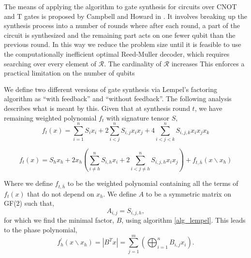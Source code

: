 \documentclass{article}
\theoremstyle{definition}
\theoremstyle{problem}
\theoremstyle{lemma}
\begin{document}
		 The means of applying the algorithm to gate synthesis for circuits over CNOT and T gates is proposed by Campbell and Howard in \cite{1_Campbell_2017}. It involves breaking up the synthesis process into a number of rounds where after each round, a part of the circuit is synthesized and the remaining part acts on one fewer qubit than the previous round. In this way we reduce the problem size until it is feasible to use the computationally inefficient optimal Reed-Muller decoder, which requires searching over every element of $\mathcal{R}$. The cardinality of $\mathcal{R}$ increases This enforces a practical limitation on the number of qubits 
		
		We define two different versions of gate synthesis via Lempel's factoring algorithm as ``with feedback'' and ``without feedback''. The following analysis describes what is meant by this. Given that at synthesis round $t$, we have remaining weighted polynomial $f_t$ with signature tensor $S$,
		\begin{equation}
		f_t(x) = \sum_{i=1}^n S_{i}x_i + 2\sum_{i<j}^n S_{i,j}x_i x_j + 4 \sum_{i<j<k}^n S_{i,j,k}x_i x_j x_k
		\end{equation}
		
		\begin{equation}
		\label{e_working3}
		f_t(x) = S_h x_h + 2x_h\left(\sum_{i\neq h}^n S_{i,h} x_i + 2\sum_{i<j\neq h}^n S_{i,j,h}x_i x_j\right) + f_{t,\bar{h}}(x\backslash x_h)
		\end{equation}
		
		Where we define $f_{t,\bar{h}}$ to be the weighted polynomial containing all the terms of $f_t(x)$ that do not depend on $x_h$. We define $A$ to be a symmetric matrix on GF(2) such that,
		\begin{equation}
		A_{i,j} = S_{i,j,h},
		\end{equation}
		for which we find the minimal factor, $B$, using algorithm \ref{alg_lempel}. This leads to the phase polynomial,
		\begin{equation}
		f^\prime_{h}(x\backslash x_h) = |B^Tx| = \sum_{j=1}^m\left(\bigoplus_{i=1}^n B_{i,j}x_i\right).
		\end{equation}
		
\end{document}
